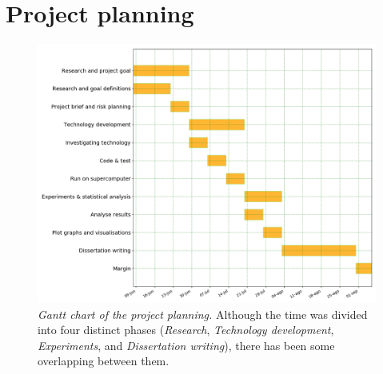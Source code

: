 \chapter{Project planning}
\begin{figure}
	\centering
	\includegraphics[width=1\linewidth]{Figures/gantt}
	\caption{\textit{Gantt chart of the project planning.} Although the time was divided into four distinct phases (\textit{Research}, \textit{Technology development}, \textit{Experiments}, and \textit{Dissertation writing}), there has been some overlapping between them.}
	\label{fig:gantt}
\end{figure}